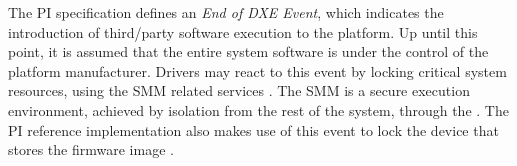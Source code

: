 The \ac{PI} specification defines an \emph{End of \acs{DXE} Event}, which indicates the introduction of third\-/party software execution to the platform.
Up until this point, it is assumed that the entire system software is under the control of the platform manufacturer.
Drivers may react to this event by locking critical system resources, using the \ac{SMM} related services \cite[Vol. 2, 5.1.2.1]{pi-spec}.
The \ac{SMM} is a secure execution environment, achieved by isolation from the rest of the system, through the  \cite[Vol. 4, Section 1.3]{pi-spec}.
The \ac{PI} reference implementation also makes use of this event to lock the device that stores the firmware image \cite{tianocore-edk2-fmpdxe}.

